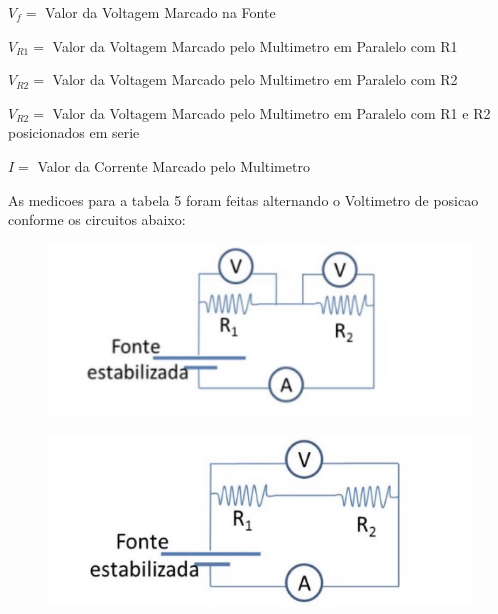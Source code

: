 \documentclass[article]{abntex2}
\begin{document}
$V_f =$ Valor da Voltagem Marcado na Fonte

$V_{R1} =$ Valor da Voltagem Marcado pelo Multimetro
 em Paralelo com R1

$V_{R2} =$ Valor da Voltagem Marcado pelo Multimetro 
em Paralelo com R2

$V_{R2} =$ Valor da Voltagem Marcado pelo Multimetro
 em Paralelo com R1 e R2 posicionados em serie

$I =$ Valor da Corrente Marcado pelo Multimetro
\newline   

As medicoes para a tabela 5 foram feitas alternando o Voltimetro 
de posicao conforme os  circuitos abaixo:
\begin{figure}[htb]
\begin{center}
\includegraphics[scale=0.4]{circuito2.jpg} 
\end{center}
\end{figure}
\begin{figure}[htb]
\begin{center}
\includegraphics[scale=0.4]{circuito3.jpg} 
\end{center}
\end{figure}
\newpage
\end{document}
